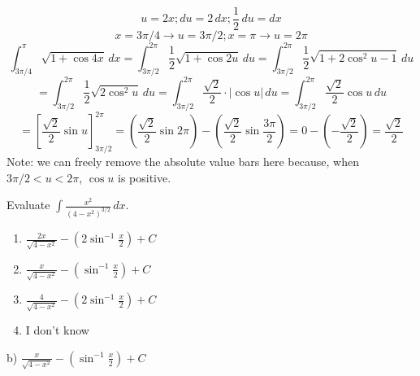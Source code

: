 \documentclass[addpoints,12pt,answers]{exam}
\begin{document}
\begin{questions}
\begin{solution}
    $$u=2x; du=2\,dx; \frac{1}{2}\,du=dx$$
    $$x=3\pi/4\rightarrow u=3\pi/2; x=\pi\rightarrow u=2\pi$$
    $$\displaystyle\int_{3\pi/4}^{\pi}\sqrt{1+\cos 4x}\,dx=\int_{3\pi/2}^{2\pi}\frac{1}{2}\sqrt{1+\cos 2u}\,du=\int_{3\pi/2}^{2\pi}\frac{1}{2}\sqrt{1+2\cos^2 u-1}\,du$$
    $$=\int_{3\pi/2}^{2\pi}\frac{1}{2}\sqrt{2\cos^2 u}\,du=\int_{3\pi/2}^{2\pi}\frac{\sqrt{2}}{2}\cdot|\cos u|\,du=\int_{3\pi/2}^{2\pi}\frac{\sqrt{2}}{2}\cos u\,du$$
    $$=\left[\frac{\sqrt{2}}{2}\sin u\right]_{3\pi/2}^{2\pi}=\left(\frac{\sqrt{2}}{2}\sin 2\pi\right)-\left(\frac{\sqrt{2}}{2}\sin\frac{3\pi}{2}\right)=0-\left(-\frac{\sqrt{2}}{2}\right)=\frac{\sqrt{2}}{2}$$
    Note: we can freely remove the absolute value bars here because, when $3\pi/2<u<2\pi$, $\cos u$ is positive.
  \end{solution}
  \newpage
  \question
  Evaluate $\displaystyle\int\frac{x^2}{(4-x^2)^{3/2}}\,dx$.
  \begin{enumerate}[label=\alph*)]
    \item
    $\displaystyle\frac{2x}{\sqrt{4-x^2}}-\left(2\sin^{-1}\frac{x}{2}\right)+C$
    \item
    $\displaystyle\frac{x}{\sqrt{4-x^2}}-\left(\sin^{-1}\frac{x}{2}\right)+C$
    \item
    $\displaystyle\frac{4}{\sqrt{4-x^2}}-\left(2\sin^{-1}\frac{x}{2}\right)+C$
    \item
    I don't know
  \end{enumerate}
  \begin{solution}
    b) $\displaystyle\frac{x}{\sqrt{4-x^2}}-\left(\sin^{-1}\frac{x}{2}\right)+C$
    

\end{solution}
\end{questions}
\end{document}
